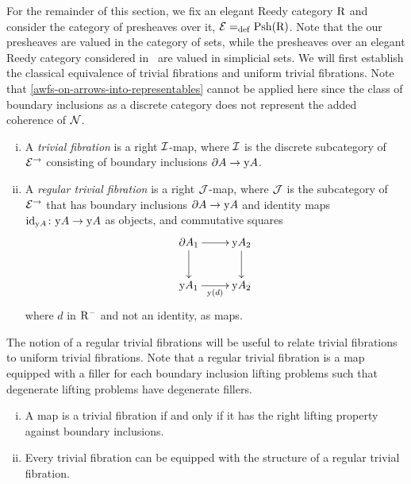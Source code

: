 \documentclass[reqno,10pt,a4paper,oneside,draft]{amsart}
\begin{document}
\medskip

For the remainder of this section, we fix an elegant Reedy category $\R$ and consider the category of presheaves over it, $\calE \defeq \Rhat$. Note that the our presheaves are valued in the category of sets, while the presheaves over an elegant Reedy category considered in~\cite{shulman:reedy} are valued in simplicial sets.  We will first establish the classical equivalence of trivial fibrations and uniform trivial fibrations.
Note that \cref{awfs-on-arrows-into-representables} cannot be applied here since the class of boundary inclusions as a discrete category does not represent the added coherence of $\cal{N}$.

\begin{definition} \hfill
\begin{enumerate}[(i)]
\item A \emph{trivial fibration} is a right $\cal{I}$-map, where $\cal{I}$ is the discrete subcategory of $\catE^{\to}$ consisting of boundary inclusions $\partial A \to \yon A$.
\item A \emph{regular trivial fibration} is a right $\cal{J}$-map, where $\cal{J}$ is the subcategory of~$\catE^{\to}$ that has boundary inclusions $\partial A \to \yon A$ and identity maps $\id_{\yon A} \co \yon A \to \yon A$ as objects, and commutative squares
\[
\xymatrix{
  \partial A_1
  \ar[r]
  \ar[d]
&
  \yon A_2
  \ar[d]
\\
  \yon A_1
  \ar[r]_{\yon(d)}
&
  \yon A_2
}
\]
where $d$ in $\Rm$ and not an identity, as maps.
\end{enumerate}
\end{definition}

The notion of a regular trivial fibrations will be useful to relate trivial fibrations to uniform trivial fibrations.
Note that a regular trivial fibration is a map equipped with a filler for each boundary inclusion lifting problems such that degenerate lifting problems have degenerate fillers.

\begin{proposition} \label{trivial-fibration-to-regular} \hfill
\begin{enumerate}[(i)]
\item A map is a trivial fibration if and only if it has the right lifting property against boundary inclusions.
\item Every trivial fibration can be equipped with the structure of a regular trivial fibration.
\end{enumerate}
\end{proposition}
\end{document}
